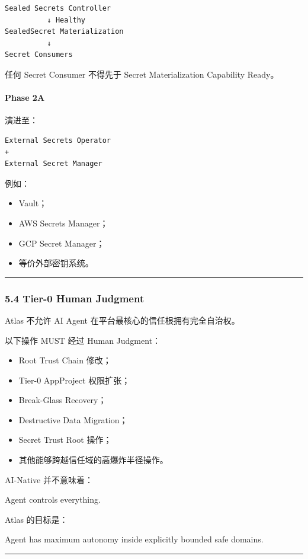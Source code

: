 \documentclass[11pt,a4paper]{article}
\begin{document}
\begin{lstlisting}[language=text]
Sealed Secrets Controller
          ↓ Healthy
SealedSecret Materialization
          ↓
Secret Consumers
\end{lstlisting}
任何 Secret Consumer 不得先于 Secret Materialization Capability Ready。

\paragraph{Phase 2A}
演进至：

\begin{lstlisting}[language=text]
External Secrets Operator
+
External Secret Manager
\end{lstlisting}
例如：

\begin{itemize}
  \item Vault；
  \item AWS Secrets Manager；
  \item GCP Secret Manager；
  \item 等价外部密钥系统。
\end{itemize}
\vspace{0.5em}\hrule\vspace{0.5em}
\subsubsection{5.4 Tier-0 Human Judgment}
Atlas 不允许 AI Agent 在平台最核心的信任根拥有完全自治权。

以下操作 MUST 经过 Human Judgment：

\begin{itemize}
  \item Root Trust Chain 修改；
  \item Tier-0 AppProject 权限扩张；
  \item Break-Glass Recovery；
  \item Destructive Data Migration；
  \item Secret Trust Root 操作；
  \item 其他能够跨越信任域的高爆炸半径操作。
\end{itemize}
AI-Native 并不意味着：

\begin{gfmBlockquote}
Agent controls everything.
\end{gfmBlockquote}
Atlas 的目标是：

\begin{gfmBlockquote}
Agent has maximum autonomy inside explicitly bounded safe domains.
\end{gfmBlockquote}
\vspace{0.5em}\hrule\vspace{0.5em}
\end{document}
